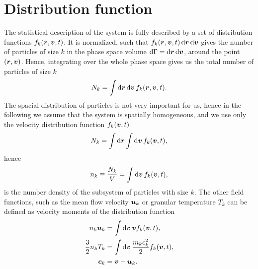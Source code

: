 \documentclass[aps,prl,preprint,groupedaddress,10pt]{revtex4-2}
\begin{document}
\section{Distribution function}
The statistical description of the system is fully described by a set of distribution
functions $f_k\pqty{\br,\bv,t}$. It is normalized, such that 
$f_k\pqty{\br,\bv,t}\dd{\br}\dd{\bv}$ gives the number of particles of size $k$
in the phase space volume $\dd{\Gamma}=\dd{\vb*{r}}\dd{\vb*{v}}$, around the point 
$\pqty{\br,\bv}$. Hence, integrating over the whole phase space gives us the total
number of particles of size $k$
\begin{equation}
    N_k=\int\dd{\br}\dd{\bv}f_k\pqty{\br,\bv,t}.
\end{equation}
The spacial distribution of particles is not very important for us, hence in the following
we assume that the system is spatially homogeneous, and we use only the velocity
distribution function $f_k\pqty{\bv,t}$
\begin{equation}
    N_k=\int\dd{\br}\int\dd{\bv}f_k\pqty{\bv,t},
\end{equation}
hence 
\begin{equation}
    n_k\equiv\frac{N_k}{V}=\int\dd{\bv}f_k\pqty{\bv,t},
\end{equation}
is the number density of the subsystem of particles with size $k$. The other field 
functions, such as the mean flow velocity $\vb*{u}_k$ or granular temperature $T_k$ 
can be defined as velocity moments of the distribution function
\begin{equation}
    \begin{split}
        n_k\bu_k &= \int\dd{\bv}\bv f_k\pqty{\bv,t},\\
        \frac{3}{2}n_kT_k &=\int\dd{\bv}\frac{m_kc_k^2}{2}f_k\pqty{\bv,t},\\
        \bc_k &= \bv-\bu_k.
    \end{split}
\end{equation}
\end{document}
